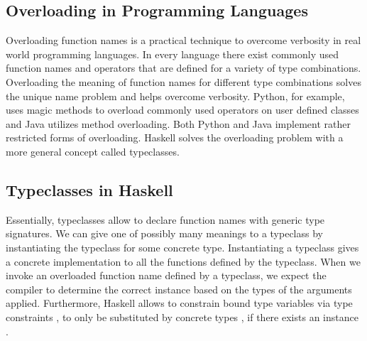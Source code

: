 \subsection{Overloading in Programming Languages}
Overloading function names is a practical technique to overcome verbosity in real world programming languages. 
In every language there exist commonly used function names and operators that are defined for a variety of type combinations.
Overloading the meaning of function names for different type combinations solves the unique name problem and helps overcome verbosity.
Python, for example, uses magic methods to overload commonly used operators on user defined classes and Java utilizes method overloading. Both Python and Java implement rather restricted forms of overloading. Haskell solves the overloading problem with a more general concept called typeclasses.

\subsection{Typeclasses in Haskell}
Essentially, typeclasses allow to declare function names with generic type signatures.
We can give one of possibly many meanings to a typeclass by instantiating the typeclass for some concrete type. Instantiating a typeclass gives a concrete implementation to all the functions defined by the typeclass.
When we invoke an overloaded function name defined by a typeclass, we expect the compiler to determine the correct instance based on the types of the arguments applied. 
Furthermore, Haskell allows to constrain bound type variables  via type constraints , to only be substituted by concrete types , if there exists an instance  .

